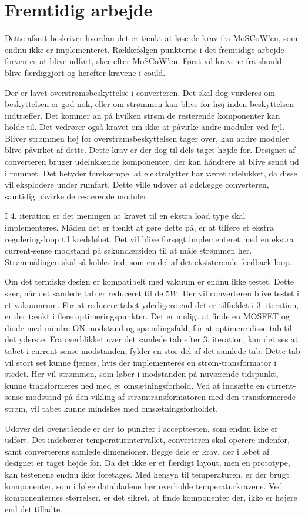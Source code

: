 \chapter{Fremtidig arbejde} \label{future}
Dette afsnit beskriver hvordan det er tænkt at løse de krav fra MoSCoW'en, som endnu ikke er implementeret. Rækkefølgen punkterne i det fremtidige arbejde forventes at blive udført, sker efter MoSCoW'en. Først vil kravene fra should blive færdiggjort og herefter kravene i could.  

Der er lavet overstrømsbeskyttelse i converteren. Det skal dog vurderes om beskyttelsen er god nok, eller om strømmen kan blive for høj inden beskyttelsen indtræffer. Det kommer an på hvilken strøm de resterende komponenter kan holde til. Det vedrører også kravet om ikke at påvirke andre moduler ved fejl. Bliver strømmen høj før overstrømsbeskyttelsen tager over, kan andre moduler blive påvirket af dette. Dette krav er der dog til dels taget højde for. Designet af converteren bruger udelukkende komponenter, der kan håndtere at blive sendt ud i rummet. Det betyder foreksempel at elektrolytter har været udelukket, da disse vil eksplodere under rumfart. Dette ville udover at ødelægge converteren, samtidig påvirke de resterende moduler.

I 4. iteration er det meningen at kravet til en ekstra load type skal implementeres. Måden det er tænkt at gøre dette på, er at tilføre et ekstra reguleringsloop til kredsløbet. Det vil blive forsøgt implementeret med en ekstra current-sense modstand på sekundærsiden til at måle strømmen her. Strømmålingen skal så kobles ind, som en del af det eksisterende feedback loop.

Om det termiske design er kompatibelt med vakuum er endnu ikke testet. Dette sker, når det samlede tab er reduceret til de $5W$. Her vil converteren blive testet i et vakuumrum. For at reducere tabet yderligere end det er tilfældet i 3. iteration, er der tænkt i flere optimeringspunkter. Det er muligt at finde en MOSFET og diode med mindre ON modstand og spændingsfald, for at optimere disse tab til det yderste. 
Fra overblikket over det samlede tab efter 3. iteration, kan det ses at tabet i current-sense modstanden, fylder en stor del af det samlede tab. Dette tab vil stort set kunne fjernes, hvis der implementeres en strøm-transformator i stedet. Her vil strømmen, som løber i modstanden på nuværende tidspunkt, kunne transformeres ned med et omsætningsforhold. Ved at indsætte en current-sense modstand på den vikling af strømtransformatoren med den transformerede strøm, vil tabet kunne mindskes med omsætningsforholdet.  

Udover det ovenstående er der to punkter i accepttesten, som endnu ikke er udført. Det indebærer temperaturintervallet, converteren skal operere indenfor, samt converterens samlede dimensioner. Begge dele er krav, der i løbet af designet er taget højde for. Da det ikke er et færdigt layout, men en prototype, kan testenene endnu ikke foretages. Med hensyn til temperaturen, er der brugt komponenter, som i følge databladene bør overholde temperaturkravene. Ved komponenternes størrelser, er det sikret, at finde komponenter der, ikke er højere end det tilladte.    


